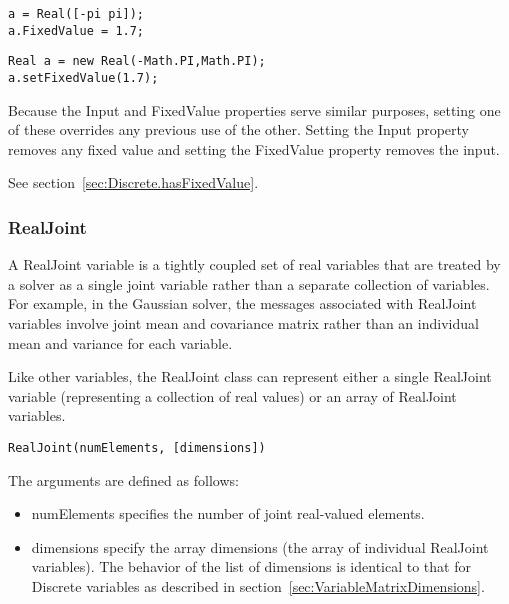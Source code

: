 \ifmatlab
\begin{lstlisting}
a = Real([-pi pi]);
a.FixedValue = 1.7;
\end{lstlisting}
\fi

\ifjava
\begin{lstlisting}
Real a = new Real(-Math.PI,Math.PI);
a.setFixedValue(1.7);
\end{lstlisting}
\fi

Because the Input and FixedValue properties serve similar purposes, setting one of these overrides any previous use of the other.  Setting the Input property removes any fixed value and setting the FixedValue property removes the input.




See section~\ref{sec:Discrete.hasFixedValue}.



\subsubsection{RealJoint}

A RealJoint variable is a tightly coupled set of real variables that are treated by a solver as a single joint variable rather than a separate collection of variables.  For example, in the Gaussian solver, the messages associated with RealJoint variables involve joint mean and covariance matrix rather than an individual mean and variance for each variable.

Like other variables, the RealJoint class can represent either a single RealJoint variable (representing a collection of real values) or an array of RealJoint variables.


\ifmatlab
\begin{lstlisting}
RealJoint(numElements, [dimensions])
\end{lstlisting}

The arguments are defined as follows:

\begin{itemize}
\item numElements specifies the number of joint real-valued elements.
\item dimensions specify the array dimensions (the array of individual RealJoint variables).  The behavior of the list of dimensions is identical to that for Discrete variables as described in section~\ref{sec:VariableMatrixDimensions}.
\end{itemize}
\fi

